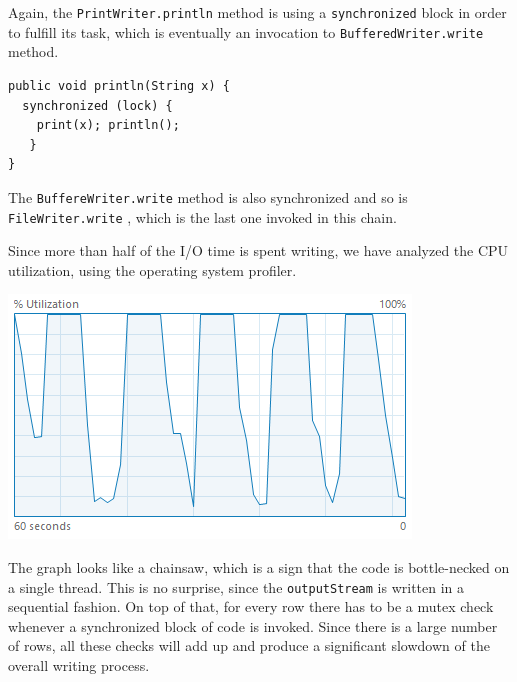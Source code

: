 \documentclass[a4paper,twoside]{article}
\begin{document}
Again, the {\texttt{PrintWriter.println} } method is using a {\texttt{synchronized} } block in order to fulfill its task, which is eventually an invocation to {\texttt{BufferedWriter.write} } method.
\begin{verbatim}
public void println(String x) {
  synchronized (lock) {
    print(x); println();
   }
}
\end{verbatim}
The {\texttt{BuffereWriter.write} } method is also synchronized and so is {\texttt{FileWriter.write} }, which is the last one invoked in this chain.

Since more than half of the I/O time is spent writing, we have analyzed the CPU utilization, using the operating system profiler.
\begin{center}
\includegraphics[scale=0.5]{images/cpu_original.png}
\end{center}
The graph looks like a chainsaw, which is a sign that the code is bottle-necked on a single thread.
This is no surprise, since the {\texttt{outputStream} } is written in a sequential fashion.
On top of that, for every row there has to be a mutex check whenever a synchronized block of code is invoked.
Since there is a large number of rows, all these checks will add up and produce a significant slowdown of the overall writing process.
\end{document}
